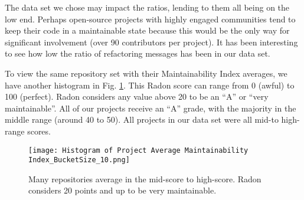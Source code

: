 The data set we chose may impact the ratios, lending to them all being on the low end. Perhaps open-source projects with highly engaged communities tend to keep their code in a maintainable state because this would be the only way for significant involvement (over 90 contributors per project). It has been interesting to see how low the ratio of refactoring messages has been in our data set.

To view the same repository set with their Maintainability Index averages, we have another histogram in Fig. \ref{figHistogramAvgMI}. This Radon score can range from 0 (awful) to 100 (perfect). Radon considers any value above 20 to be an ``A'' or ``very maintainable''. All of our projects receive an ``A'' grade, with the majority in the middle range (around 40 to 50). All projects in our data set were all mid-to high-range scores.

\begin{figure}[ht]
  \centerline{
    \texttt{[image: Histogram of Project Average Maintainability Index\_BucketSize\_10.png]}
  }
  \caption{Many repositories average in the mid-score to high-score. Radon considers 20 points and up to be very maintainable.}
  \label{figHistogramAvgMI}
\end{figure}
